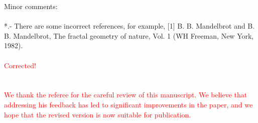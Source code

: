 \documentclass[prd,aps,nofootinbib]{revtex4}
\begin{document}
Minor comments:\\
\\
*.- There are some incorrect references, for example, [1] B. B. Mandelbrot and B. B. Mandelbrot, The fractal geometry of nature, Vol. 1 (WH Freeman, New York, 1982).\\
\\
\textcolor{red}{Corrected!}\\
\\
\\
\textcolor{red}{ We thank the referee for the careful review of this manuscript. We believe that addressing his feedback has led to significant improvements in the paper, and we hope that the revised version is now suitable for publication.}\\
\\


\vspace{1cm}

\noindent
\end{document}
